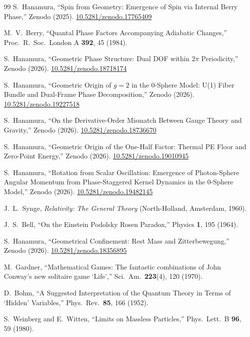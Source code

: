 \documentclass[%
 reprint, amsmath,amssymb, aps, prb, ]{revtex4-2}
\numberwithin{equation}{section}
\begin{document}
\begin{thebibliography}{99}
 S.~Hanamura, ``Spin from Geometry: Emergence of Spin via Internal Berry Phase,'' Zenodo (2025). \href{https://doi.org/10.5281/zenodo.17765409}{10.5281/zenodo.17765409}

 M.~V.~Berry, ``Quantal Phase Factors Accompanying Adiabatic Changes,'' Proc.\ R.\ Soc.\ London A \textbf{392}, 45 (1984).

 S.~Hanamura, ``Geometric Phase Structure: Dual DOF within $2\pi$ Periodicity,'' Zenodo (2026). \href{https://doi.org/10.5281/zenodo.18718174}{10.5281/zenodo.18718174}

 S.~Hanamura, ``Geometric Origin of $g=2$ in the 0-Sphere Model: U(1) Fiber Bundle and Dual-Frame Phase Decomposition,'' Zenodo (2026). \href{https://doi.org/10.5281/zenodo.19227518}{10.5281/zenodo.19227518}

 S.~Hanamura, ``On the Derivative-Order Mismatch Between Gauge Theory and Gravity,'' Zenodo (2026). \href{https://doi.org/10.5281/zenodo.18736670}{10.5281/zenodo.18736670}

 S.~Hanamura, ``Geometric Origin of the One-Half Factor: Thermal PE Floor and Zero-Point Energy,'' Zenodo (2026). \href{https://doi.org/10.5281/zenodo.19010945}{10.5281/zenodo.19010945}

 S.~Hanamura, ``Rotation from Scalar Oscillation: Emergence of Photon-Sphere Angular Momentum from Phase-Staggered Kernel Dynamics in the 0-Sphere Model,'' Zenodo (2026). \href{https://doi.org/10.5281/zenodo.19482145}{10.5281/zenodo.19482145}

 J.~L.~Synge, \textit{Relativity: The General Theory} (North-Holland, Amsterdam, 1960).

 J.~S.~Bell, ``On the Einstein Podolsky Rosen Paradox,'' Physics \textbf{1}, 195 (1964).

 S.~Hanamura, ``Geometrical Confinement: Rest Mass and Zitterbewegung,'' Zenodo (2026). \href{https://doi.org/10.5281/zenodo.18356895}{10.5281/zenodo.18356895}

 M.~Gardner, ``Mathematical Games: The fantastic combinations of John Conway's new solitaire game `Life','' Sci.\ Am.\ \textbf{223}(4), 120 (1970).

 D.~Bohm, ``A Suggested Interpretation of the Quantum Theory in Terms of `Hidden' Variables,'' Phys.\ Rev.\ \textbf{85}, 166 (1952).

 S.~Weinberg and E.~Witten, ``Limits on Massless Particles,'' Phys.\ Lett.\ B \textbf{96}, 59 (1980).

\end{thebibliography}
\end{document}
